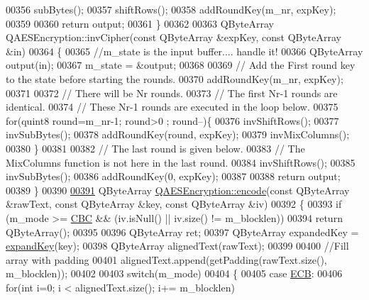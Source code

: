 \begin{DoxyCode}
00356   subBytes();
00357   shiftRows();
00358   addRoundKey(m\_nr, expKey);
00359 
00360   \textcolor{keywordflow}{return} output;
00361 \}
00362 
00363 QByteArray QAESEncryption::invCipher(\textcolor{keyword}{const} QByteArray &expKey, \textcolor{keyword}{const} QByteArray &in)
00364 \{
00365     \textcolor{comment}{//m\_state is the input buffer.... handle it!}
00366     QByteArray output(in);
00367     m\_state = &output;
00368 
00369     \textcolor{comment}{// Add the First round key to the state before starting the rounds.}
00370     addRoundKey(m\_nr, expKey);
00371 
00372     \textcolor{comment}{// There will be Nr rounds.}
00373     \textcolor{comment}{// The first Nr-1 rounds are identical.}
00374     \textcolor{comment}{// These Nr-1 rounds are executed in the loop below.}
00375     \textcolor{keywordflow}{for}(quint8 round=m\_nr-1; round>0 ; round--)\{
00376         invShiftRows();
00377         invSubBytes();
00378         addRoundKey(round, expKey);
00379         invMixColumns();
00380     \}
00381 
00382     \textcolor{comment}{// The last round is given below.}
00383     \textcolor{comment}{// The MixColumns function is not here in the last round.}
00384     invShiftRows();
00385     invSubBytes();
00386     addRoundKey(0, expKey);
00387 
00388     \textcolor{keywordflow}{return} output;
00389 \}
00390 
\hypertarget{qaesencryption_8cpp_source.tex_l00391}{}\hyperlink{class_q_a_e_s_encryption_a0c56eddd6f03e93b1f7faad464044d65}{00391} QByteArray \hyperlink{class_q_a_e_s_encryption_a0c56eddd6f03e93b1f7faad464044d65}{QAESEncryption::encode}(\textcolor{keyword}{const} QByteArray &rawText, \textcolor{keyword}{const} QByteArray &key, \textcolor{keyword}{
      const} QByteArray &iv)
00392 \{
00393     \textcolor{keywordflow}{if} (m\_mode >= \hyperlink{class_q_a_e_s_encryption_ad3e031c49a3d56566379d75b40b7b255a559bffc55d3599d0a172cc85aed98966}{CBC} && (iv.isNull() || iv.size() != m\_blocklen))
00394        \textcolor{keywordflow}{return} QByteArray();
00395 
00396     QByteArray ret;
00397     QByteArray expandedKey = \hyperlink{class_q_a_e_s_encryption_a5bfbb972f84a8376fceed648553c0912}{expandKey}(key);
00398     QByteArray alignedText(rawText);
00399 
00400     \textcolor{comment}{//Fill array with padding}
00401     alignedText.append(getPadding(rawText.size(), m\_blocklen));
00402 
00403     \textcolor{keywordflow}{switch}(m\_mode)
00404     \{
00405     \textcolor{keywordflow}{case} \hyperlink{class_q_a_e_s_encryption_ad3e031c49a3d56566379d75b40b7b255a4ca7f51778e2adf1f464164a0ba8e75e}{ECB}:
00406         \textcolor{keywordflow}{for}(\textcolor{keywordtype}{int} i=0; i < alignedText.size(); i+= m\_blocklen)

\end{DoxyCode}
